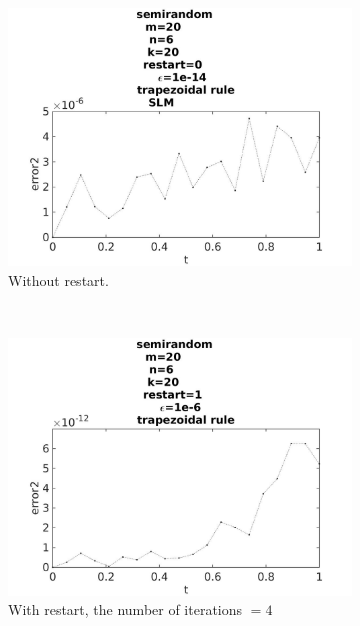 \begin{figure}[H]
        \begin{subfigure}[b]{0.3\textwidth}
                \includegraphics[width=\textwidth]{../MATLAB/fig/errortestrestart02.jpg}
                \caption{ Without restart. }
                \label{fig:energytestrestart02}
        \end{subfigure}
        ~
        \begin{subfigure}[b]{0.3\textwidth}
                \includegraphics[width=\textwidth]{../MATLAB/fig/errortestrestart22.jpg}
                \caption{ With restart, the number of iterations $= 4$ }
                \label{fig:energytestrestart22}
        \end{subfigure}
        ~
		\begin{subfigure}[b]{0.3\textwidth}

\end{subfigure}
\end{figure}
